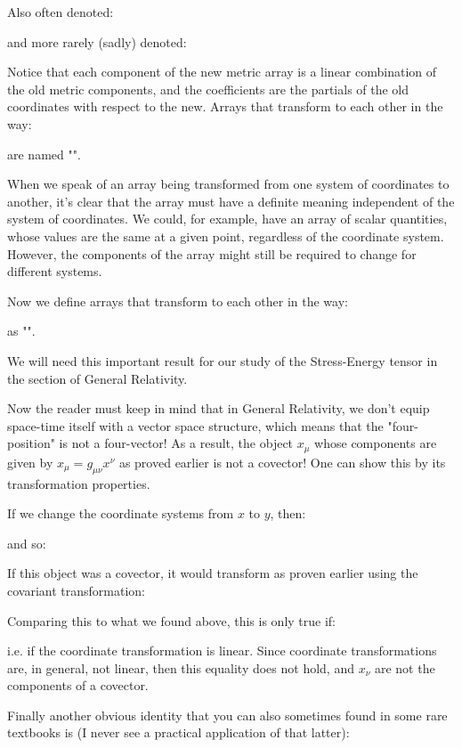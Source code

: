 	Also often denoted:
	
	and more rarely (sadly) denoted:
	
	Notice that each component of the new metric array is a linear combination of the old metric components, and the coefficients are the partials of the old coordinates with respect to the new. Arrays  that transform to each other in the way:
	
	 are named "".
	 
	 When we speak of an array being transformed from one system of coordinates to another, it's clear that the array must have a definite meaning independent of the system of coordinates. We could, for example, have an array of scalar quantities, whose values are the same at a given point, regardless of the coordinate system. However, the components of the array might still be required to change for different systems.
	 
	 Now we define arrays that transform to each other in the way:
	
	 as "".
	
	We will need this important result for our study of the Stress-Energy tensor in the section of General Relativity.
	
	Now the reader must keep in mind that in General Relativity, we don't equip space-time itself with a vector space structure, which means that the "four-position" is not a four-vector! As a result, the object $x_{\mu}$ whose components are given by $x_{\mu}=g_{\mu \nu} x^{\nu}$ as proved earlier is not a covector! One can show this by its transformation properties.
	
	If we change the coordinate systems from $x$ to $y$, then:
	
	and so:
	
	If this object was a covector, it would transform as proven earlier using the covariant transformation:
	
	Comparing this to what we found above, this is only true if:
	
	i.e. if the coordinate transformation is linear. Since coordinate transformations are, in general, not linear, then this equality does not hold, and $x_{\nu}$ are not the components of a covector.
	
	Finally another obvious identity that you can also sometimes found in some rare textbooks is (I never see a practical application of that latter):
	
